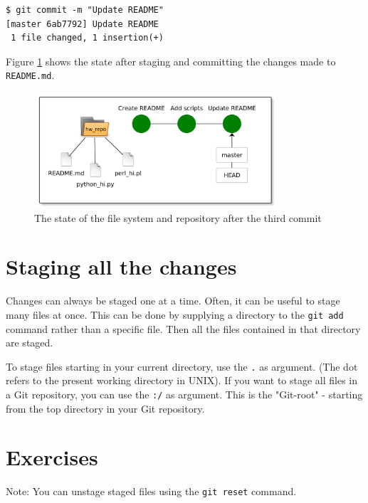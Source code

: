 \documentclass[../main/git_course_main.tex]{subfiles}
\begin{document}
\begin{codebox}
\begin{lstlisting}
$ git commit -m "Update README"
[master 6ab7792] Update README
 1 file changed, 1 insertion(+)
\end{lstlisting}
\end{codebox}

Figure \ref{fig:third_commit} shows the state after staging and committing the changes made to \verb$README.md$.

\begin{figure}[h!]
	\centering
	\includegraphics[width=0.8\textwidth]{../visualizations/chapter2/c26_repo_third_commit.pdf}
	\caption{The state of the file system and repository after the third commit}
	\label{fig:third_commit}
\end{figure}

\section{Staging all the changes}

Changes can always be staged one at a time. Often, it can be useful to stage many files at once. This can be done by supplying a directory to the \verb$git add$ command rather than a specific file. Then all the files contained in that directory are staged.

To stage files starting in your current directory, use the \verb$.$ as argument. (The dot refers to the present working directory in UNIX).
If you want to stage all files in a Git repository, you can use the \verb$:/$ as argument. This is the "Git-root" - starting from the top directory
in your Git repository.

\newpage
\section{Exercises}

Note: You can unstage staged files using the \verb$git reset$ command.
\end{document}
